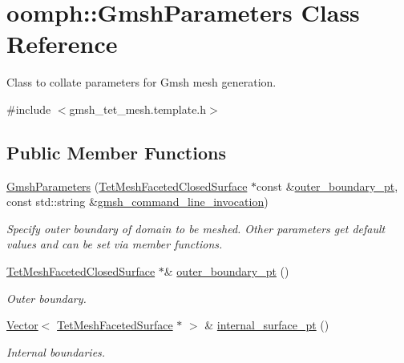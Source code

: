 \hypertarget{classoomph_1_1GmshParameters}{}\section{oomph\+:\+:Gmsh\+Parameters Class Reference}
\label{classoomph_1_1GmshParameters}


Class to collate parameters for Gmsh mesh generation.  




{\ttfamily \#include $<$gmsh\+\_\+tet\+\_\+mesh.\+template.\+h$>$}

\subsection*{Public Member Functions}
\begin{DoxyCompactItemize}
\item 
\hyperlink{classoomph_1_1GmshParameters_a6a4e43f09a5de3155dee5b3d5c1a206b}{Gmsh\+Parameters} (\hyperlink{classoomph_1_1TetMeshFacetedClosedSurface}{Tet\+Mesh\+Faceted\+Closed\+Surface} $\ast$const \&\hyperlink{classoomph_1_1GmshParameters_abdd71edac9d5fd08a6a9c978d2673a2e}{outer\+\_\+boundary\+\_\+pt}, const std\+::string \&\hyperlink{classoomph_1_1GmshParameters_aaf19a5b331893637974f5a5be8da048c}{gmsh\+\_\+command\+\_\+line\+\_\+invocation})
\begin{DoxyCompactList}\small\item\em Specify outer boundary of domain to be meshed. Other parameters get default values and can be set via member functions. \end{DoxyCompactList}\item 
\hyperlink{classoomph_1_1TetMeshFacetedClosedSurface}{Tet\+Mesh\+Faceted\+Closed\+Surface} $\ast$\& \hyperlink{classoomph_1_1GmshParameters_abdd71edac9d5fd08a6a9c978d2673a2e}{outer\+\_\+boundary\+\_\+pt} ()
\begin{DoxyCompactList}\small\item\em Outer boundary. \end{DoxyCompactList}\item 
\hyperlink{classoomph_1_1Vector}{Vector}$<$ \hyperlink{classoomph_1_1TetMeshFacetedSurface}{Tet\+Mesh\+Faceted\+Surface} $\ast$ $>$ \& \hyperlink{classoomph_1_1GmshParameters_a10f845ea8fb16bf617f5c6ca05e21bf9}{internal\+\_\+surface\+\_\+pt} ()
\begin{DoxyCompactList}\small\item\em Internal boundaries. \end{DoxyCompactList}\item 

\end{DoxyCompactItemize}
